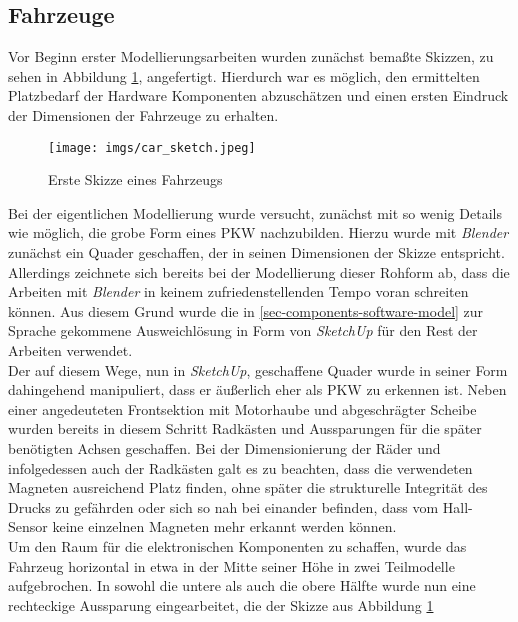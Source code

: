 \documentclass[.../Dokumentation.tex]{subfiles}
\begin{document}
\subsection{Fahrzeuge}\label{sec-ita1-cars}
Vor Beginn erster Modellierungsarbeiten wurden zunächst bemaßte Skizzen, 
zu sehen in Abbildung \ref{fig-car-sketch}, angefertigt. 
Hierdurch war es möglich, den ermittelten Platzbedarf der Hardware 
Komponenten abzuschätzen und einen ersten Eindruck der Dimensionen der 
Fahrzeuge zu erhalten.\\
\begin{figure}[H]
    \begin{center}
    \texttt{[image: imgs/car\_sketch.jpeg]}
    \caption{Erste Skizze eines Fahrzeugs}
    \label{fig-car-sketch}
\end{center}
\end{figure}
\noindent
Bei der eigentlichen Modellierung wurde versucht, zunächst mit so wenig 
Details wie möglich, die grobe Form eines PKW nachzubilden. Hierzu wurde mit 
\textit{Blender} zunächst ein Quader geschaffen, der in seinen Dimensionen 
der Skizze entspricht.\\
Allerdings zeichnete sich bereits bei der Modellierung dieser Rohform ab, 
dass die Arbeiten mit \textit{Blender} in keinem zufriedenstellenden Tempo 
voran schreiten können. Aus diesem Grund wurde die in 
\ref{sec-components-software-model} zur Sprache gekommene Ausweichlösung in 
Form von \textit{SketchUp} für den Rest der Arbeiten verwendet.\\
Der auf diesem Wege, nun in \textit{SketchUp}, geschaffene Quader wurde in 
seiner Form dahingehend manipuliert, dass er äußerlich eher als PKW zu erkennen 
ist. Neben einer angedeuteten Frontsektion mit Motorhaube und abgeschrägter 
Scheibe wurden bereits in diesem Schritt Radkästen und Aussparungen für die 
später benötigten Achsen geschaffen. 
Bei der Dimensionierung der Räder und infolgedessen auch der Radkästen galt 
es zu beachten, dass die verwendeten Magneten ausreichend Platz finden, 
ohne später die strukturelle Integrität des Drucks zu gefährden oder sich so 
nah bei einander befinden, dass vom Hall-Sensor keine einzelnen Magneten 
mehr erkannt werden können.\\
Um den Raum für die elektronischen Komponenten zu schaffen, wurde das Fahrzeug 
horizontal in etwa in der Mitte seiner Höhe in zwei Teilmodelle aufgebrochen.
In sowohl die untere als auch die obere Hälfte wurde nun eine rechteckige 
Aussparung eingearbeitet, die der Skizze aus Abbildung \ref{fig-car-sketch} 
\end{document}
